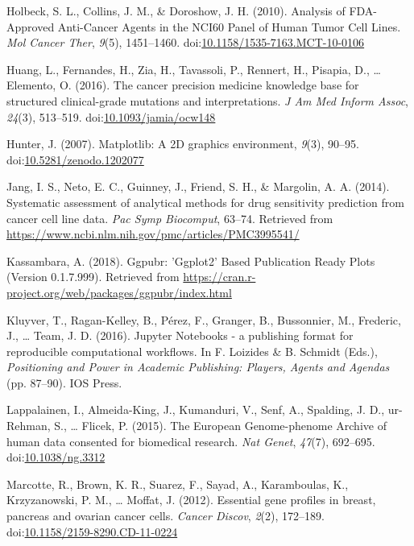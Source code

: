 \documentclass[man,floatsintext]{apa6}
\begin{document}
\hypertarget{ref-holbeck2010}{}
Holbeck, S. L., Collins, J. M., \& Doroshow, J. H. (2010). Analysis of
FDA-Approved Anti-Cancer Agents in the NCI60 Panel of Human Tumor Cell
Lines. \emph{Mol Cancer Ther}, \emph{9}(5), 1451--1460.
doi:\href{https://doi.org/10.1158/1535-7163.MCT-10-0106}{10.1158/1535-7163.MCT-10-0106}

\hypertarget{ref-huang2016}{}
Huang, L., Fernandes, H., Zia, H., Tavassoli, P., Rennert, H., Pisapia,
D., \ldots{} Elemento, O. (2016). The cancer precision medicine
knowledge base for structured clinical-grade mutations and
interpretations. \emph{J Am Med Inform Assoc}, \emph{24}(3), 513--519.
doi:\href{https://doi.org/10.1093/jamia/ocw148}{10.1093/jamia/ocw148}

\hypertarget{ref-hunter2007}{}
Hunter, J. (2007). Matplotlib: A 2D graphics environment, \emph{9}(3),
90--95.
doi:\href{https://doi.org/10.5281/zenodo.1202077}{10.5281/zenodo.1202077}

\hypertarget{ref-jang2014}{}
Jang, I. S., Neto, E. C., Guinney, J., Friend, S. H., \& Margolin, A. A.
(2014). Systematic assessment of analytical methods for drug sensitivity
prediction from cancer cell line data. \emph{Pac Symp Biocomput},
63--74. Retrieved from
\url{https://www.ncbi.nlm.nih.gov/pmc/articles/PMC3995541/}

\hypertarget{ref-kassambara2018}{}
Kassambara, A. (2018). Ggpubr: 'Ggplot2' Based Publication Ready Plots
(Version 0.1.7.999). Retrieved from
\url{https://cran.r-project.org/web/packages/ggpubr/index.html}

\hypertarget{ref-kluyver2016}{}
Kluyver, T., Ragan-Kelley, B., Pérez, F., Granger, B., Bussonnier, M.,
Frederic, J., \ldots{} Team, J. D. (2016). Jupyter Notebooks - a
publishing format for reproducible computational workflows. In F.
Loizides \& B. Schmidt (Eds.), \emph{Positioning and Power in Academic
Publishing: Players, Agents and Agendas} (pp. 87--90). IOS Press.

\hypertarget{ref-lappalainen2015}{}
Lappalainen, I., Almeida-King, J., Kumanduri, V., Senf, A., Spalding, J.
D., ur-Rehman, S., \ldots{} Flicek, P. (2015). The European
Genome-phenome Archive of human data consented for biomedical research.
\emph{Nat Genet}, \emph{47}(7), 692--695.
doi:\href{https://doi.org/10.1038/ng.3312}{10.1038/ng.3312}

\hypertarget{ref-marcotte2012}{}
Marcotte, R., Brown, K. R., Suarez, F., Sayad, A., Karamboulas, K.,
Krzyzanowski, P. M., \ldots{} Moffat, J. (2012). Essential gene profiles
in breast, pancreas and ovarian cancer cells. \emph{Cancer Discov},
\emph{2}(2), 172--189.
doi:\href{https://doi.org/10.1158/2159-8290.CD-11-0224}{10.1158/2159-8290.CD-11-0224}
\end{document}
